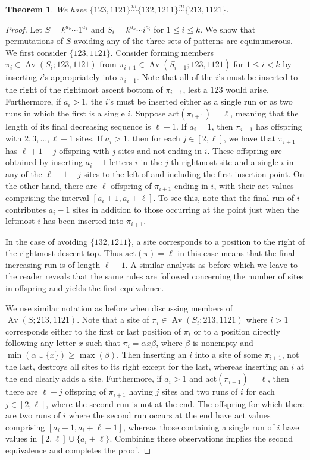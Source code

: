 \documentclass[11pt]{amsart}
\theoremstyle{plain}
\newtheorem{theorem}{Theorem}[section]
\theoremstyle{definition}
\newcommand{\csim}{\stackrel{m}{\sim}}
\DeclareMathOperator{\Av}{Av}
\begin{document}
\begin{theorem}\label{123,1121}
 We have $\{123,1121\}\csim\{132,1211\}\csim\{213,1121\}$.\label{1231121th}
\end{theorem}
\begin{proof}
Let $S=k^{a_k}\cdots1^{a_1}$ and $S_i=k^{a_k}\cdots i^{a_i}$ for $1 \leq i \leq k$.  We show
that permutations of $S$ avoiding any of the three sets of patterns are equinumerous.  We first
consider $\{123,1121\}$.  Consider forming members $\pi_i \in \Av(S_i;123,1121)$ from $\pi_{i+1}
\in \Av(S_{i+1};123,1121)$ for $1 \leq i<k$ by inserting $i$'s appropriately into $\pi_{i+1}$.
Note that all of the $i$'s must be inserted to the right of the rightmost ascent bottom of
$\pi_{i+1}$, lest a $123$ would arise.  Furthermore, if $a_i>1$, the $i$'s must be inserted either as
a single run or as two runs in which the first is a single $i$.  Suppose
$\text{act}(\pi_{i+1})=\ell$, meaning that the length of its final decreasing sequence is $\ell-1$.
If $a_{i}=1$, then $\pi_{i+1}$ has offspring with $2,3,\ldots,\ell+1$ sites.  If $a_i>1$, then for
each $j \in [2,\ell]$, we have that $\pi_{i+1}$ has $\ell+1-j$ offspring with $j$ sites and not
ending in $i$.  These offspring are obtained by inserting $a_i-1$ letters $i$ in the $j$-th rightmost
site and a single $i$ in any of the $\ell+1-j$ sites to the left of and including the first insertion
point.  On the other hand, there are $\ell$ offspring of $\pi_{i+1}$ ending in $i$, with their act
values comprising the interval $[a_i+1,a_i+\ell]$.  To see this, note that the final run of $i$
contributes $a_i-1$ sites in addition to those occurring at the point just when the leftmost $i$ has
been inserted into $\pi_{i+1}$.

In the case of avoiding $\{132,1211\}$, a site corresponds to a position to the right of the
rightmost descent top.  Thus $\text{act}(\pi)=\ell$ in this case means that the final increasing run
is of length $\ell-1$.  A similar analysis as before which we leave to the reader reveals that the
same rules are followed concerning the number of sites in offspring and yields the first equivalence.

We use similar notation as before when discussing members of $\Av(S;213,1121)$.  Note that a site of
$\pi_i \in \Av(S_i;213,1121)$ where $i>1$ corresponds either to the first or last position of
$\pi_i$ or to a position directly following any letter $x$ such that $\pi_i=\alpha x \beta$, where
$\beta$ is nonempty and $\min(\alpha\cup\{x\}) \geq \max(\beta)$.  Then inserting an $i$ into a site
of some $\pi_{i+1}$, not the last, destroys all sites to its right except for the last, whereas
inserting an $i$ at the end clearly adds a site.  Furthermore, if $a_i>1$ and
$\text{act}(\pi_{i+1})=\ell$, then there are $\ell-j$ offspring of $\pi_{i+1}$ having $j$ sites and
two runs of $i$ for each $j \in [2,\ell]$, where the second run is not at the end.  The offspring for
which there are two runs of $i$ where the second run occurs at the end have act values comprising
$[a_i+1,a_i+\ell-1]$, whereas those containing a single run of $i$ have values in
$[2,\ell]\cup\{a_i+\ell\}$. Combining these observations implies the second equivalence and completes
the proof.
\end{proof}
\end{document}
